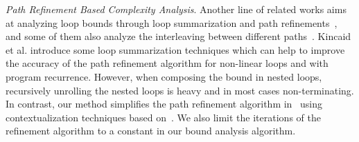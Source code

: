 \emph{Path Refinement Based Complexity Analysis}.
Another line of related works aims at analyzing loop bounds through loop summarization and path refinements~\cite{ManoliosV06,BalakrishnanSIG09,SharmaDDA11,Flores-MontoyaH14,HumenbergerJK18,CyphertBKR19}, and some of them also analyze the interleaving between different paths~\cite{GulwaniJK09,ZulegerGSV11}.
Kincaid et al.\cite{KincaidBCR19,KincaidCBR18,BreckCKR20} introduce some loop summarization techniques which can help to improve the accuracy of the path refinement algorithm for non-linear loops and with program recurrence.
However, when composing the bound in nested loops, recursively unrolling the nested loops is heavy and in most cases non-terminating.
%
In contrast, our method simplifies the path refinement algorithm in~\cite{GulwaniJK09} using contextualization techniques based on~\cite{ZulegerGSV11,SinnZV14,ManoliosV06}.
We also limit the iterations of the refinement algorithm to a constant in our bound analysis algorithm.